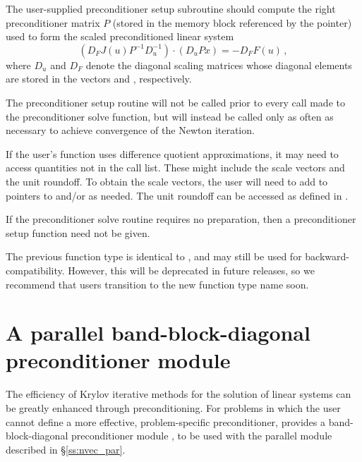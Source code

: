 {
  The user-supplied preconditioner setup subroutine should
  compute the right preconditioner matrix $P$ (stored in the memory
  block referenced by the  pointer) used to form the
  scaled preconditioned linear system
    $$(D_F J(u) P^{-1} D_u^{-1}) \cdot (D_u P x) = - D_F F(u) \, ,$$
   where $D_u$ and $D_F$ denote the diagonal scaling matrices whose
  diagonal elements are stored in the vectors  and
  , respectively.

  The preconditioner setup routine will not be called prior
  to every call made to the preconditioner solve function, but will instead be
  called only as often as necessary to achieve convergence of the
  Newton iteration.

  If the user's  function uses difference quotient
  approximations, it may need to access quantities not in the call list.
  These might include the scale vectors and the unit roundoff.
  To obtain the scale vectors, the user will need to add to 
  pointers to  and/or  as needed.
  The unit roundoff can be accessed as  defined in
  .

  If the preconditioner solve routine requires no preparation, then a
  preconditioner setup function need not be given.

  The previous function type  is identical to
  , and may still be used for backward-compatibility.
  However, this will be deprecated in future releases, so we recommend
  that users transition to the new function type name soon.
}

\section{A parallel band-block-diagonal preconditioner module}
\label{sss:kinbbdpre}
The efficiency of Krylov iterative methods for the solution of linear systems
can be greatly enhanced through preconditioning. For problems in which the
user cannot define a more effective, problem-specific preconditioner,
{\kinsol} provides a band-block-diagonal preconditioner module {\kinbbdpre},
to be used with the parallel  module described in \S\ref{ss:nvec_par}.

